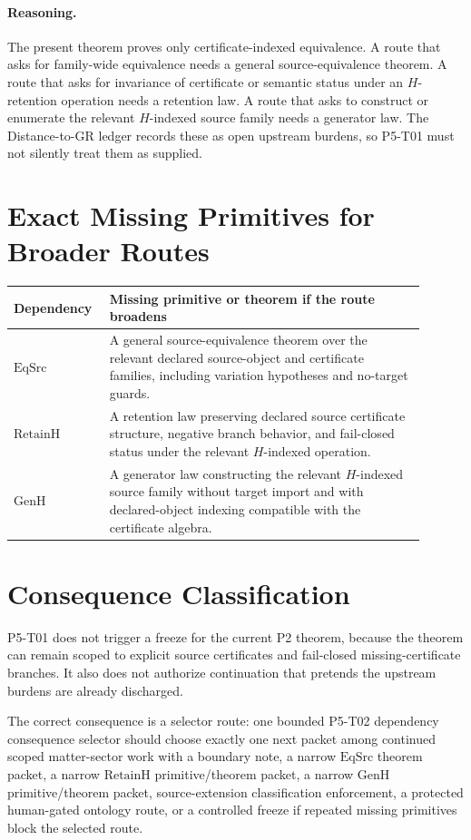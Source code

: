 \documentclass[11pt]{article}
\newcommand{\EqSrc}{\mathrm{EqSrc}}
\newcommand{\RetainH}{\mathrm{RetainH}}
\newcommand{\GenH}{\mathrm{GenH}}
\begin{document}
\paragraph{Reasoning.}
The present theorem proves only certificate-indexed equivalence. A route that
asks for family-wide equivalence needs a general source-equivalence theorem.
A route that asks for invariance of certificate or semantic status under an
\(H\)-retention operation needs a retention law. A route that asks to construct
or enumerate the relevant \(H\)-indexed source family needs a generator law.
The Distance-to-GR ledger records these as open upstream burdens, so P5-T01
must not silently treat them as supplied.

\section*{Exact Missing Primitives for Broader Routes}

\begin{longtable}{p{0.18\linewidth}p{0.72\linewidth}}
\textbf{Dependency} & \textbf{Missing primitive or theorem if the route broadens} \\
\hline
\(\EqSrc\) &
A general source-equivalence theorem over the relevant declared source-object
and certificate families, including variation hypotheses and no-target
guards. \\
\(\RetainH\) &
A retention law preserving declared source certificate structure, negative
branch behavior, and fail-closed status under the relevant \(H\)-indexed
operation. \\
\(\GenH\) &
A generator law constructing the relevant \(H\)-indexed source family without
target import and with declared-object indexing compatible with the
certificate algebra. \\
\end{longtable}

\section*{Consequence Classification}

P5-T01 does not trigger a freeze for the current P2 theorem, because the
theorem can remain scoped to explicit source certificates and fail-closed
missing-certificate branches. It also does not authorize continuation that
pretends the upstream burdens are already discharged.

The correct consequence is a selector route:
one bounded P5-T02 dependency consequence selector should choose exactly one
next packet among continued scoped matter-sector work with a boundary note, a
narrow \(\EqSrc\) theorem packet, a narrow \(\RetainH\) primitive/theorem
packet, a narrow \(\GenH\) primitive/theorem packet, source-extension
classification enforcement, a protected human-gated ontology route, or a
controlled freeze if repeated missing primitives block the selected route.
\end{document}
